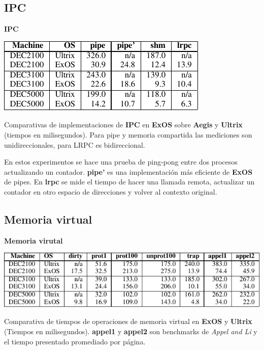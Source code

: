 \documentclass[10pt]{beamer}
\begin{document}
\subsection{IPC}

\begin{frame}
\textbf{IPC} \\[2em]
\begin{table}
\includegraphics[scale=0.8]{grafico-ipc.pdf}
\caption{Comparativas de implementaciones de \textbf{IPC} en \textbf{ExOS} sobre \textbf{Aegis} y \textbf{Ultrix} (tiempos en milisegundos). Para pipe y memoria compartida las mediciones son unidireccionales, para LRPC es bidireccional.}
\end{table}
En estos experimentos se hace una prueba de ping-pong entre dos procesos actualizando un contador. \textbf{pipe'} es una implementación más eficiente de \textbf{ExOS} de pipes. En \textbf{lrpc} se mide el tiempo de hacer una llamada remota, actualizar un contador en otro espacio de direcciones y volver al contexto original. 
\end{frame}

\subsection{Memoria virtual}

\begin{frame}
 \textbf{Memoria virutal} \\[2em]
\begin{table}
\includegraphics[scale=0.8]{grafico-vm.pdf}
\caption{Comparativa de tiempos de operaciones de memoria virtual en \textbf{ExOS} y \textbf{Ultrix} (Tiempos en milisegundos). \textbf{appel1} y \textbf{appel2} son benchmarks de \emph{Appel and Li} y el tiempo presentado promediado por página.}
\end{table}
\end{frame}
\end{document}
